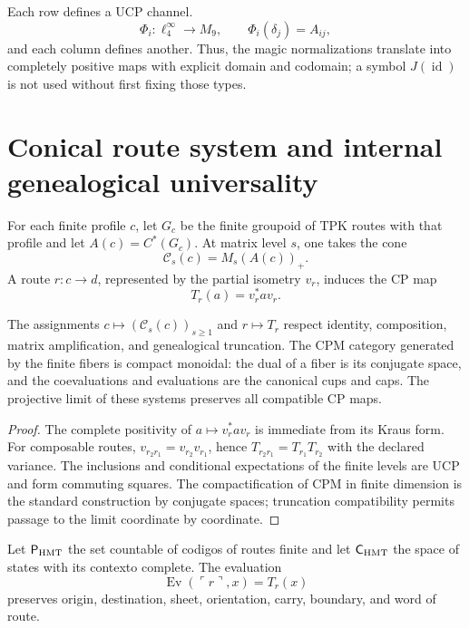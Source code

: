 Each row defines a UCP channel.
\[
 \Phi_i:\ell^\infty_4\to M_9,
 \qquad \Phi_i(\delta_j)=A_{ij},
\]
and each column defines another. Thus, the magic normalizations translate into
completely positive maps with explicit domain and codomain; a symbol
\(J(\operatorname{id})\) is not used without first fixing those types.

\section{Conical route system and internal genealogical universality}
\label{sec:cpe-s-system-universalidad}

For each finite profile \(c\), let \(G_c\) be the finite groupoid of TPK routes
with that profile and let \(A(c)=C^*(G_c)\). At matrix level \(s\), one takes the
cone
\[
 \mathcal C_s(c)=M_s(A(c))_+.
\]
A route \(r:c\to d\), represented by the partial isometry \(v_r\),
induces the CP map
\[
 T_r(a)=v_r^*av_r.
\]

\begin{theorem}
\label{thm:cpe-s-system-tpk}
The assignments \(c\mapsto(\mathcal C_s(c))_{s\ge1}\) and
\(r\mapsto T_r\) respect identity, composition, matrix amplification, and
genealogical truncation. The CPM category generated by the finite fibers
is compact monoidal: the dual of a fiber is its conjugate space, and the
coevaluations and evaluations are the canonical cups and caps. The projective
limit of these systems preserves all compatible CP maps.
\end{theorem}

\begin{proof}
The complete positivity of \(a\mapsto v_r^*av_r\) is immediate from its
Kraus form. For composable routes,
\(v_{r_2r_1}=v_{r_2}v_{r_1}\), hence
\(T_{r_2r_1}=T_{r_1}T_{r_2}\) with the declared variance. The inclusions and
conditional expectations of the finite levels are UCP and form commuting
squares. The compactification of CPM in finite dimension is the standard construction
by conjugate spaces; truncation compatibility permits
passage to the limit coordinate by coordinate.
\end{proof}

Let \(\mathsf P_{\rm HMT}\) the set countable of codigos of routes
finite and let \(\mathsf C_{\rm HMT}\) the space of states with its contexto
complete. The evaluation
\[
 \operatorname{Ev}(\ulcorner r\urcorner,x)=T_r(x)
\]
preserves origin, destination, sheet, orientation, carry, boundary, and word of route.

